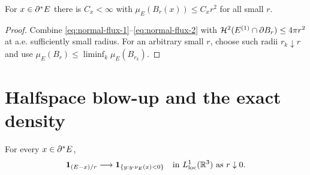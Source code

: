 \begin{lemma}\label{lem:reduced-perimeter}
For $x\in\partial^* E$ there is $C_x<\infty$ with $\mu_E(B_r(x))\le C_xr^2$ for all
small $r$.
\end{lemma}

\begin{proof}
Combine \eqref{eq:normal-flux-1}--\eqref{eq:normal-flux-2} with
$\mathcal H^2(E^{(1)}\cap\partial B_r)\le4\pi r^2$ at a.e. sufficiently small radius.
For an arbitrary small $r$, choose such radii $r_k\downarrow r$ and use
$\mu_E(B_r)\le\liminf_k\mu_E(B_{r_k})$.
\end{proof}

\section{Halfspace blow-up and the exact density}

\begin{theorem}\label{thm:halfspace-blowup}
For every $x\in\partial^* E$,
\begin{equation}\label{eq:halfspace-blowup}
  \mathbf 1_{(E-x)/r}\longrightarrow\mathbf 1_{\{y : y\cdot \nu_E(x) < 0\}}
  \quad\text{in }L^1_{\mathrm{loc}}(\mathbb R^3)\text{ as }r\downarrow0 .
\end{equation}
\end{theorem}

